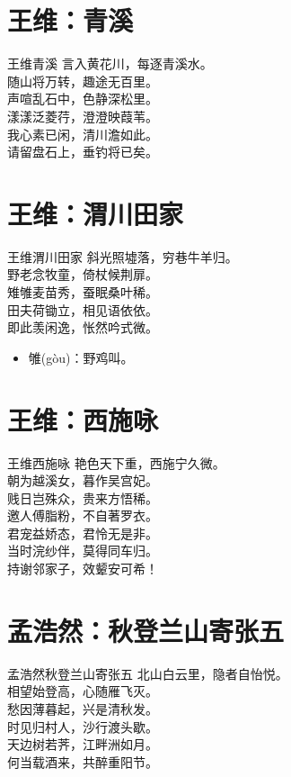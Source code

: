 \documentclass[12pt,oneside,a5paper]{book}
\begin{document}
\chapter{王维：青溪}
\begin{poemzh}{王维}{青溪}
言入黄花川，每逐青溪水。\\
随山将万转，趣途无百里。\\
声喧乱石中，色静深松里。\\
漾漾泛菱荇，澄澄映葭苇。\\
我心素已闲，清川澹如此。\\
请留盘石上，垂钓将已矣。\\ 
\end{poemzh}

\chapter{王维：渭川田家}
\begin{poemzh}{王维}{渭川田家}
斜光照墟落，穷巷牛羊归。\\
野老念牧童，倚杖候荆扉。\\
雉雊麦苗秀，蚕眠桑叶稀。\\
田夫荷锄立，相见语依依。\\
即此羡闲逸，怅然吟式微。\\ 
\end{poemzh}


\begin{itemize}
\item 雊(gòu)：野鸡叫。
\end{itemize}

\chapter{王维：西施咏}
\begin{poemzh}{王维}{西施咏}
艳色天下重，西施宁久微。\\
朝为越溪女，暮作吴宫妃。\\
贱日岂殊众，贵来方悟稀。\\
邀人傅脂粉，不自著罗衣。\\
君宠益娇态，君怜无是非。\\
当时浣纱伴，莫得同车归。\\
持谢邻家子，效颦安可希！\\ 
\end{poemzh}

\chapter{孟浩然：秋登兰山寄张五}
\begin{poemzh}{孟浩然}{秋登兰山寄张五}
北山白云里，隐者自怡悦。\\
相望始登高，心随雁飞灭。\\
愁因薄暮起，兴是清秋发。\\
时见归村人，沙行渡头歇。\\
天边树若荠，江畔洲如月。\\
何当载酒来，共醉重阳节。\\ 
\end{poemzh}
\end{document}
